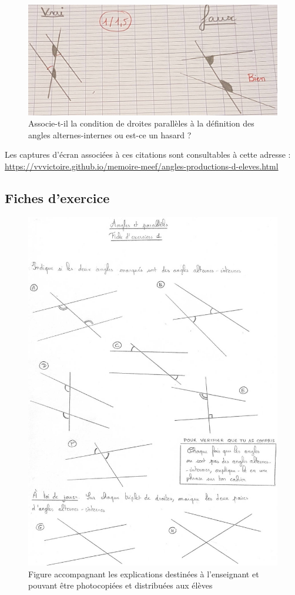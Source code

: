 \begin{figure}[h!]
    \centering
    \includegraphics[width=0.6\linewidth]{img/anglesquestion.jpg}
    \caption{Associe-t-il la condition de droites parallèles à la définition des angles alternes-internes ou est-ce un hasard ?}
\end{figure}

Les captures d'écran associées à ces citations sont consultables à cette adresse : \url{https://vvvictoire.github.io/memoire-meef/angles-productions-d-eleves.html}

\clearpage

\subsection{Fiches d'exercice}\label{annexe:angles-fiches}

\begin{figure}[h!]
    \centering
    \includegraphics[width=0.6\linewidth]{img/anglesfiche1.jpg}
    \caption{Figure accompagnant les explications destinées à l'enseignant et pouvant être photocopiées et distribuées aux élèves}
    \label{fig:angles-fiche1}
\end{figure}

